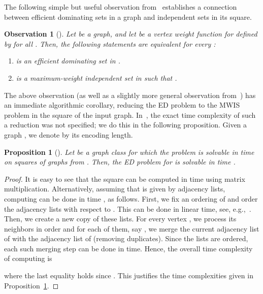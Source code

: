 \documentclass[]{elsarticle}
\newtheorem{proposition}[theorem]{Proposition}
\newtheorem{observation}[theorem]{Observation}
\def\mwis{{\sc{MWIS }}}
\begin{document}
The following simple but useful observation from~\cite{BLR} establishes a connection between efficient dominating sets in a graph  and independent sets in its square.

\begin{observation}[\cite{BLR}]\label{lem:eds-wis}
Let  be a graph, and let  be a vertex weight function for  defined by  for all . 
Then, the following statements are equivalent for every :
\begin{enumerate}
  \item[(i)]  is an efficient dominating set in .
  \item[(ii)]  is a maximum-weight independent set in  such that .
\end{enumerate}
\end{observation}

The above observation (as well as a slightly more general observation from~\cite{Milanic}) has an immediate algorithmic corollary, reducing the ED problem to the MWIS problem in the square of the input graph. 
In~\cite{BLR,Milanic}, the exact time complexity of such a reduction was not specified; we do this in the following proposition.
Given a graph , we denote by  its encoding length.

\begin{proposition}[\cite{BLR,Milanic}]\label{prop:1}
Let  be a graph class for which the \mwis problem is solvable in time  on squares of graphs from .
Then, the ED problem for  is solvable in time \hbox{}.
\end{proposition}

\begin{proof}
It is easy to see that the square  can be computed in time  using matrix multiplication. 
Alternatively, assuming that  is given by adjacency lists, computing  can be done in time , as follows. 
First, we fix an ordering  of  and order the adjacency lists with respect to .
This can be done in linear time, see, e.g.,~\cite[p.~]{Gol04}.
Then, we create a new copy of these lists. For every vertex , we process its neighbors in order and for each of them, say , we merge the current adjacency list of  with the adjacency list of  (removing duplicates).
Since the lists are ordered, each such merging step can be done in  time.
Hence, the overall time complexity of computing  is

where the last equality holds since .
This justifies the time complexities given in Proposition~\ref{prop:1}.
\end{proof}
\end{document}
